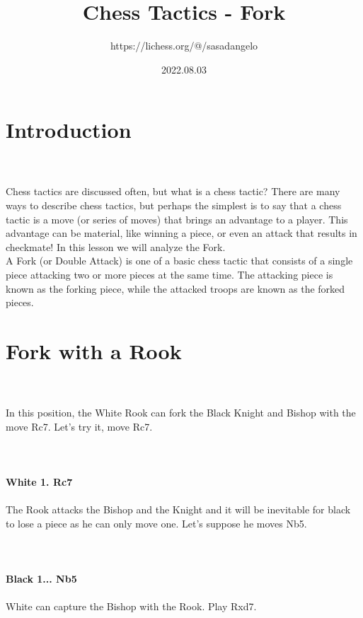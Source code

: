 \documentclass{article}
\title{Chess Tactics - Fork}
\author{https://lichess.org/@/sasadangelo}
\date{2022.08.03}
\begin{document}
\begin{titlepage}
\maketitle
\end{titlepage}
\section{ Introduction}

\\
\\
Chess tactics are discussed often, but what is a chess tactic? There are many ways to describe chess tactics, but perhaps the simplest is to say that a chess tactic is a move (or series of moves) that brings an advantage to a player. This advantage can be material, like winning a piece, or even an attack that results in checkmate! In this lesson we will analyze the Fork.\\A Fork (or Double Attack) is one of a basic chess tactic that consists of a single piece attacking two or more pieces at the same time. The attacking piece is known as the forking piece, while the attacked troops are known as the forked pieces.\section{ Fork with a Rook}

\\
\\
In this position, the White Rook can fork the Black Knight and Bishop with the move Rc7. Let's try it, move Rc7.\\
\\

\\
\\
\textbf{White 1. Rc7}\\
\\
The Rook attacks the Bishop and the Knight and it will be inevitable for black to lose a piece as he can only move one. Let's suppose he moves Nb5.\\
\\

\\
\\
\textbf{Black 1... Nb5}\\
\\
White can capture the Bishop with the Rook. Play Rxd7.\\
\end{document}

